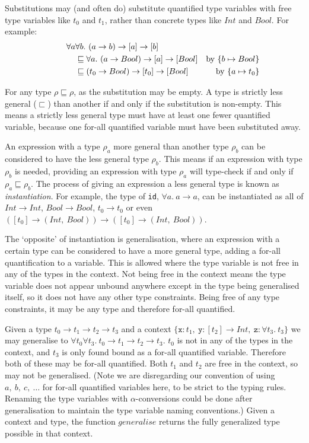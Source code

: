\documentclass[a4paper,fleqn,oneside,12pt]{report}
\begin{document}
Substitutions may (and often do) substitute quantified type variables with free type variables like $t_0$ and $t_1$, rather than concrete types like $Int$ and $Bool$. For example:
\begin{align*}
\hspace{0.75cm}\forall a & \forall b.\ (a \rightarrow b) \rightarrow [a] \rightarrow [b]
\\& \sqsubseteq \forall a.\ (a \rightarrow Bool) \rightarrow [a] \rightarrow [Bool] &\textrm{by}\ \{ b \mapsto Bool \}
\\&\sqsubseteq (t_0 \rightarrow Bool) \rightarrow [t_0] \rightarrow [Bool] &\textrm{by}\ \{ a \mapsto t_0 \}
\end{align*}

For any type $\rho \sqsubseteq \rho$, as the substitution may be empty. A type is strictly less general ($\sqsubset$) than another if and only if the substitution is non-empty. This means a strictly less general type must have at least one fewer quantified variable, because one for-all quantified variable must have been substituted away.

An expression with a type $\rho_a$ more general than another type $\rho_b$ can be considered to have the less general type $\rho_b$. This means if an expression with type $\rho_b$ is needed, providing an expression with type $\rho_a$ will type-check if and only if $\rho_a \sqsubseteq \rho_b$. The process of giving an expression a less general type is known as \textit{instantiation}. For example, the type of \texttt{id}, $\forall a.\ a \rightarrow a$, can be instantiated as all of $Int \rightarrow Int$, $Bool \rightarrow Bool$, $t_0 \rightarrow t_0$ or even $([t_0] \rightarrow (Int,\ Bool)) \rightarrow ([t_0] \rightarrow (Int,\ Bool))$.

The `opposite' of instantiation is generalisation, where an expression with a certain type can be considered to have a more general type, adding a for-all quantification to a variable. This is allowed where the type variable is not free in any of the types in the context. Not being free in the context means the type variable does not appear unbound anywhere except in the type being generalised itself, so it does not have any other type constraints. Being free of any type constraints, it may be any type and therefore for-all quantified.

Given a type $t_0 \rightarrow t_1 \rightarrow t_2 \rightarrow t_3$ and a context $\{ \mathtt{x} : t_1,\ \mathtt{y} : [t_2] \rightarrow Int,\ \mathtt{z} : \forall t_3.\ t_3 \}$ we may generalise to $\forall t_0 \forall t_3.\ t_0 \rightarrow t_1 \rightarrow t_2 \rightarrow t_3$. $t_0$ is not in any of the types in the context, and $t_3$ is only found bound as a for-all quantified variable. Therefore both of these may be for-all quantified. Both $t_1$ and $t_2$ are free in the context, so may not be generalised. (Note we are disregarding our convention of using $a,\ b,\ c,\ \dots$ for for-all quantified variables here, to be strict to the typing rules. Renaming the type variables with $\alpha$-conversions could be done after generalisation to maintain the type variable naming conventions.) Given a context and type, the function $\mathit{generalise}$ returns the fully generalized type possible in that context.
\end{document}
